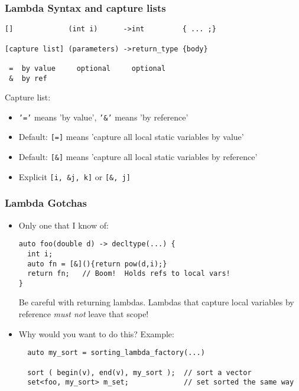 \begin{frame}[fragile,t]
\frametitle{Lambda Syntax and capture lists}

{\scriptsize
\begin{verbatim}
[]             (int i)      ->int         { ... ;}

[capture list] (parameters) ->return_type {body} 

 =  by value     optional     optional
 &  by ref      
\end{verbatim}
}

Capture list:
\begin{itemize}
\item \texttt{'='} means 'by value',  \texttt{'\&'} means 'by reference'
\item Default:  \texttt{[=]} means 'capture all local static variables by value' 
\item Default:  \texttt{[\&]} means 'capture all local static variables by reference' 
\item Explicit \texttt{[i, \&j, k]}  or \texttt{[\&, j]}  
\end{itemize}

\end{frame}

\begin{frame}[fragile,t]
\frametitle{Lambda Gotchas}
\begin{itemize}
\item Only one that I know of:
{\scriptsize
\begin{verbatim}
auto foo(double d) -> decltype(...) {
  int i;
  auto fn = [&](){return pow(d,i);}
  return fn;   // Boom!  Holds refs to local vars!
}
\end{verbatim}}

Be careful with returning lambdas.  Lambdas that capture local
variables by reference \emph{must not} leave that scope!

\vskip 18pt


\item Why would you want to do this?  Example:
{\scriptsize
\begin{verbatim}
  auto my_sort = sorting_lambda_factory(...)

  sort ( begin(v), end(v), my_sort );  // sort a vector
  set<foo, my_sort> m_set;             // set sorted the same way
\end{verbatim}
}

\end{itemize}
\end{frame}



